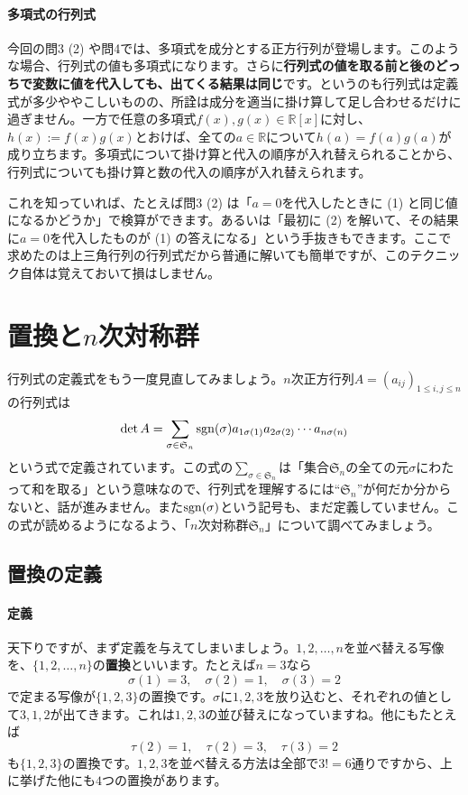 \paragraph{多項式の行列式}

今回の問3 (2) や問4では、多項式を成分とする正方行列が登場します。このような場合、行列式の値も多項式になります。さらに\textbf{行列式の値を取る前と後のどっちで変数に値を代入しても、出てくる結果は同じ}です。というのも行列式は定義式が多少ややこしいものの、所詮は成分を適当に掛け算して足し合わせるだけに過ぎません。一方で任意の多項式$f(x), g(x) \in \mathbb{R}[x]$に対し、$h(x) := f(x)g(x)$とおけば、全ての$a \in \mathbb{R}$について$h(a) = f(a)g(a)$が成り立ちます。多項式について掛け算と代入の順序が入れ替えられることから、行列式についても掛け算と数の代入の順序が入れ替えられます。

これを知っていれば、たとえば問3 (2) は「$a = 0$を代入したときに (1) と同じ値になるかどうか」で検算ができます。あるいは「最初に (2) を解いて、その結果に$a = 0$を代入したものが (1) の答えになる」という手抜きもできます。ここで求めたのは上三角行列の行列式だから普通に解いても簡単ですが、このテクニック自体は覚えておいて損はしません。

\section{置換と$n$次対称群}

行列式の定義式をもう一度見直してみましょう。$n$次正方行列$A = (a_{ij})_{1 \leq i, j \leq n}$の行列式は
\[
\det A = \sum_{\sigma \in \mathfrak{S}_n} \operatorname{sgn}(\sigma) a_{1 \sigma(1)} a_{2 \sigma(2)} \cdots a_{n \sigma(n)}
\]
という式で定義されています。この式の$\sum_{\sigma \in \mathfrak{S}_n}$は「集合$\mathfrak{S}_n$の全ての元$\sigma$にわたって和を取る」という意味なので、行列式を理解するには``$\mathfrak{S}_n$''が何だか分からないと、話が進みません。また$\operatorname{sgn}(\sigma)$という記号も、まだ定義していません。この式が読めるようになるよう、「$n$次対称群$\mathfrak{S}_n$」について調べてみましょう。

\subsection{置換の定義}

\paragraph{定義}

天下りですが、まず定義を与えてしまいましょう。$1, 2, \ldots, n$を並べ替える写像を、$\{1, 2, \ldots, n\}$の\textbf{置換}といいます。たとえば$n = 3$なら
\[
\sigma(1) = 3, \quad \sigma(2) = 1, \quad \sigma(3) = 2
\]
で定まる写像が$\{1, 2, 3\}$の置換です。$\sigma$に$1, 2, 3$を放り込むと、それぞれの値として$3, 1, 2$が出てきます。これは$1, 2, 3$の並び替えになっていますね。他にもたとえば
\[
\tau(2) = 1, \quad \tau(2) = 3, \quad \tau(3) = 2
\]
も$\{1, 2, 3\}$の置換です。$1, 2, 3$を並べ替える方法は全部で$3! = 6$通りですから、上に挙げた他にも$4$つの置換があります。

